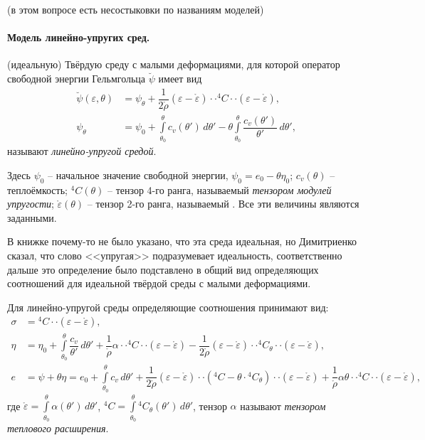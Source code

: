 
(в этом вопросе есть несостыковки по названиям моделей)

\paragraph{Модель линейно-упругих сред.}
\begin{definition}
  (идеальную) Твёрдую среду с малыми деформациями, для которой оператор свободной энергии Гельмгольца
  $\breve{\psi}$ имеет вид
  \begin{align*}
    \breve{\psi}(\varepsilon, \theta) &= \psi_\theta + \dfrac{1}{2\mathring{\rho}} (\varepsilon - \mathring{\varepsilon}) \cdot\cdot {}^4 C \cdot\cdot (\varepsilon - \mathring{\varepsilon}), \\
    \psi_\theta &= \psi_0 + \int\limits_{\theta_0}^\theta c_v(\theta') \, d\theta' - \theta \int\limits_{\theta_0}^\theta \dfrac{c_v(\theta')}{\theta'} \, d\theta',
  \end{align*}
  называют \emph{линейно-упругой средой}.

  Здесь $\psi_0$ -- начальное значение свободной энергии, $\psi_0 = e_0 - \theta \eta_0$;
  $c_v(\theta)$ -- теплоёмкость;
  ${}^4 C (\theta)$ -- тензор 4-го ранга, называемый \emph{тензором модулей упругости};
  $\mathring{\varepsilon}(\theta)$ -- тензор 2-го ранга, называемый .
  Все эти величины являются заданными.
\end{definition}
\begin{remark}
  В книжке почему-то не было указано, что эта среда идеальная, но Димитриенко сказал, что
  слово <<упругая>> подразумевает идеальность, соответственно дальше это определение было
  подставлено в общий вид определяющих соотношений для идеальной твёрдой среды с малыми
  деформациями.
\end{remark}

Для линейно-упругой среды определяющие соотношения принимают вид:
\begin{align*}
  \sigma &= {}^4 C \cdot\cdot (\varepsilon - \mathring{\varepsilon}), \\
  \eta &= \eta_0 + \int\limits_{\theta_0}^\theta \dfrac{c_v}{\theta'} \, d\theta' + \dfrac{1}{\mathring{\rho}} \alpha \cdot\cdot {}^4 C \cdot\cdot (\varepsilon - \mathring{\varepsilon}) - \dfrac{1}{2\mathring{\rho}} (\varepsilon - \mathring{\varepsilon}) \cdot\cdot {}^4 C_\theta \cdot\cdot (\varepsilon - \mathring{\varepsilon}), \\
  e &= \psi + \theta \eta = e_0 + \int\limits_{\theta_0}^\theta c_v \, d\theta' + \dfrac{1}{2\mathring{\rho}} (\varepsilon - \mathring{\varepsilon}) \cdot\cdot \left( {}^4 C - \theta \cdot {}^4 C_\theta \right) \cdot\cdot (\varepsilon - \mathring{\varepsilon}) + \dfrac{1}{\mathring{\rho}} \alpha \theta \cdot\cdot{}^4 C \cdot\cdot (\varepsilon - \mathring{\varepsilon}),
\end{align*}
где $\mathring{\varepsilon} = \int\limits_{\theta_0}^\theta \alpha(\theta') \, d\theta'$,
${}^4 C = \int\limits_{\theta_0}^\theta {}^4 C_\theta(\theta') \, d\theta'$,
тензор $\alpha$ называют \emph{тензором теплового расширения}. 

